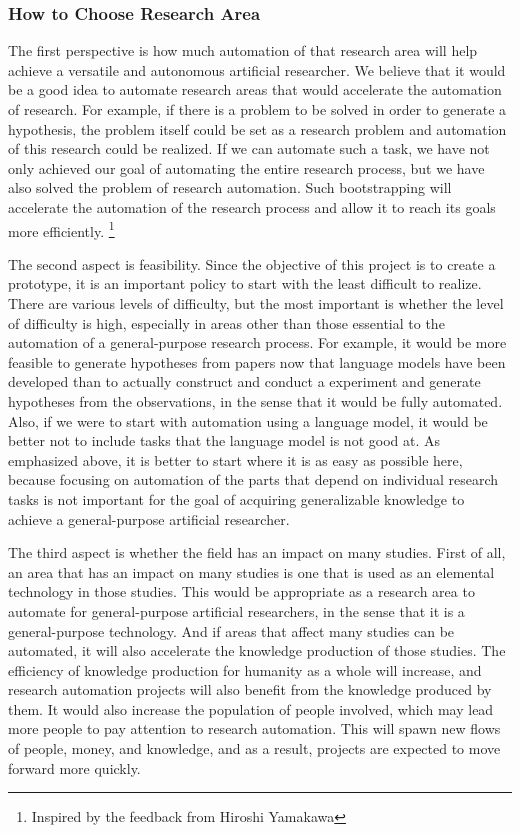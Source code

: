 \subsubsection{How to Choose Research Area}
The first perspective is how much automation of that research area will help achieve a versatile and autonomous artificial researcher. We believe that it would be a good idea to automate research areas that would accelerate the automation of research. For example, if there is a problem to be solved in order to generate a hypothesis, the problem itself could be set as a research problem and automation of this research could be realized. If we can automate such a task, we have not only achieved our goal of automating the entire research process, but we have also solved the problem of research automation. Such bootstrapping will accelerate the automation of the research process and allow it to reach its goals more efficiently. \footnote{
Inspired by the feedback from Hiroshi Yamakawa
}

The second aspect is feasibility. Since the objective of this project is to create a prototype, it is an important policy to start with the least difficult to realize. There are various levels of difficulty, but the most important is whether the level of difficulty is high, especially in areas other than those essential to the automation of a general-purpose research process. For example, it would be more feasible to generate hypotheses from papers now that language models have been developed than to actually construct and conduct a experiment and generate hypotheses from the observations, in the sense that it would be fully automated. Also, if we were to start with automation using a language model, it would be better not to include tasks that the language model is not good at. As emphasized above, it is better to start where it is as easy as possible here, because focusing on automation of the parts that depend on individual research tasks is not important for the goal of acquiring generalizable knowledge to achieve a general-purpose artificial researcher.

The third aspect is whether the field has an impact on many studies. First of all, an area that has an impact on many studies is one that is used as an elemental technology in those studies. This would be appropriate as a research area to automate for general-purpose artificial researchers, in the sense that it is a general-purpose technology. And if areas that affect many studies can be automated, it will also accelerate the knowledge production of those studies. The efficiency of knowledge production for humanity as a whole will increase, and research automation projects will also benefit from the knowledge produced by them. It would also increase the population of people involved, which may lead more people to pay attention to research automation. This will spawn new flows of people, money, and knowledge, and as a result, projects are expected to move forward more quickly.

